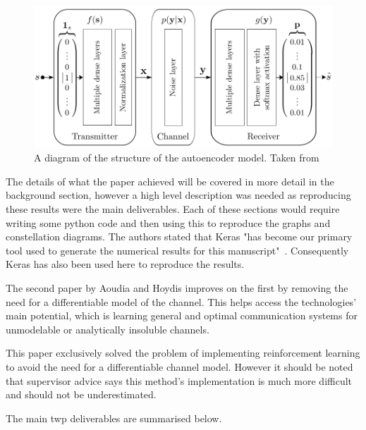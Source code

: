 \documentclass[12pt,onecolumn,letterpaper]{article}
\newcommand\genfigsize{0.5}
\begin{document}
\begin{figure}[t]
   \centering
   \includegraphics[width=\genfigsize\linewidth]{figures/oShea_autoencoder_layout.PNG}
   \caption{A diagram of the structure of the autoencoder model. Taken from~\cite{oShea}}
   \label{fig:oSheaAutoencoderLayout}
\end{figure}

The details of what the paper achieved will be covered in more detail in the background section, however a high level description was needed as reproducing these results were the main deliverables. Each of these sections would require writing some python code and then using this to reproduce the graphs and constellation diagrams. The authors stated that Keras "has become our primary tool used to generate the numerical results for this manuscript"~\cite{oShea}. Consequently Keras has also been used here to reproduce the results.

The second paper by Aoudia and Hoydis improves on the first by removing the need for a differentiable model of the channel. This helps access the technologies' main potential, which is learning general and optimal communication systems for unmodelable or analytically insoluble channels. 

This paper exclusively solved the problem of implementing reinforcement learning to avoid the need for a differentiable channel model. However it should be noted that supervisor advice says this method's implementation is much more difficult and should not be underestimated.

The main twp deliverables are summarised below.
\end{document}
